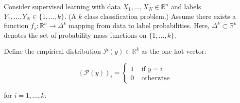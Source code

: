 \documentclass{report}
\begin{document}
\begin{definition}
    Consider supervised learning with data $X_{1}, \ldots, X_{N} \in \mathbb{R}^{n}$ and labels $Y_{1}, \ldots, Y_{N} \in\{1, \ldots, k\}$. (A $k$ class classification problem.) Assume there exists a function $f_{\star}: \mathbb{R}^{n} \rightarrow \Delta^{k}$ mapping from data to label probabilities. Here, $\Delta^{k} \subset \mathbb{R}^{k}$ denotes the set of probability mass functions on $\{1, \ldots, k\}$.

    Define the empirical distribution $\mathcal{P}(y) \in \mathbb{R}^{k}$ as the one-hot vector:

    $$
    (\mathcal{P}(y))_{i}=\left\{\begin{array}{cc}
    1 & \text { if } y=i \\
    0 & \text { otherwise }
    \end{array}\right.
    $$

    for $i=1, \ldots, k$.
\end{definition}
\end{document}
